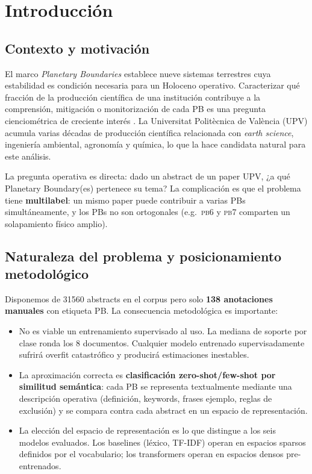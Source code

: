 \documentclass[11pt,a4paper]{article}
\newcommand{\pb}[1]{\textsc{pb#1}}
\begin{document}
\section{Introducción}

\subsection{Contexto y motivación}

El marco \emph{Planetary Boundaries} \cite{steffen2015planetary} establece nueve sistemas terrestres cuya estabilidad es condición necesaria para un Holoceno operativo. Caracterizar qué fracción de la producción científica de una institución contribuye a la comprensión, mitigación o monitorización de cada PB es una pregunta cienciométrica de creciente interés \cite{larosa2023climate,upv_ods_2024}. La Universitat Politècnica de València (UPV) acumula varias décadas de producción científica relacionada con \emph{earth science}, ingeniería ambiental, agronomía y química, lo que la hace candidata natural para este análisis.

La pregunta operativa es directa: dado un abstract de un paper UPV, ¿a qué Planetary Boundary(es) pertenece su tema? La complicación es que el problema tiene \textbf{multilabel}: un mismo paper puede contribuir a varias PBs simultáneamente, y los PBs no son ortogonales (e.g.\ \pb6 y \pb7 comparten un solapamiento físico amplio).

\subsection{Naturaleza del problema y posicionamiento metodológico}

Disponemos de \num{31560} abstracts en el corpus pero solo \textbf{138 anotaciones manuales} con etiqueta PB. La consecuencia metodológica es importante:

\begin{itemize}
\item No es viable un entrenamiento supervisado al uso. La mediana de soporte por clase ronda los 8 documentos. Cualquier modelo entrenado supervisadamente sufrirá overfit catastrófico y producirá estimaciones inestables.
\item La aproximación correcta es \textbf{clasificación zero-shot/few-shot por similitud semántica}: cada PB se representa textualmente mediante una descripción operativa (definición, keywords, frases ejemplo, reglas de exclusión) y se compara contra cada abstract en un espacio de representación.
\item La elección del espacio de representación es lo que distingue a los seis modelos evaluados. Los baselines (léxico, TF-IDF) operan en espacios sparsos definidos por el vocabulario; los transformers operan en espacios densos pre-entrenados.
\end{itemize}
\end{document}
